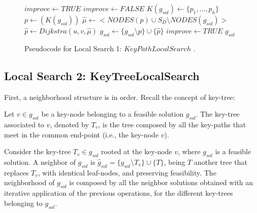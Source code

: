 \begin{figure}[H]
\begin{algorithm}[H]
\caption{$g_{sol} = KeyPathLocalSearch(G_B,C,g_{sol})$}
\begin{algorithmic}[1]
\STATE $improve \leftarrow TRUE$
\STATE $improve \leftarrow FALSE$
\STATE $K(g_{sol}) \leftarrow \{p_1,\ldots,p_h\}$ 
\STATE $p \leftarrow(K(g_{sol}))$ 
\STATE $\hat{\mu} \leftarrow <NODES(p) \cup S_D\setminus NODES(g_{sol}) > $ 
\STATE $\hat{p} \leftarrow Dijkstra(u,v,\hat{\mu})$
\STATE $g_{sol} \leftarrow \{ g_{sol}\setminus p \} \cup \{\hat{p}\}$
\STATE $improve \leftarrow TRUE$
\ENDIF
\ENDWHILE
\ENDWHILE
\RETURN $g_{sol}$
\end{algorithmic}
\end{algorithm}
\caption{Pseudocode for Local Search 1: $KeyPathLocalSearch$ \cite{11}.\label{alg-kpls}}
\end{figure}

\clearpage


\subsection{Local Search 2: KeyTreeLocalSearch}
First, a neighborhood structure is in order. Recall the concept of key-tree:

\begin{definition}
Let $v \in g_{sol}$ be a key-node belonging to a feasible solution $g_{sol}$. 
The key-tree associated to $v$, denoted by $T_v$, is the tree composed by all the 
key-paths that meet in the common end-point (i.e., the key-node $v$).
\end{definition}

\begin{definition}
Consider the key-tree $T_v \in g_{sol}$ rooted at the key-node $v$, where $g_{sol}$ is a feasible solution. 
A neighbor of $g_{sol}$ is $\hat{g}_{sol} = \{ g_{sol}\setminus T_v \} \cup \{T\}$, being 
$T$ another tree that replaces $T_v$, with identical leaf-nodes, and preserving feasibility. 
The neighborhood of $g_{sol}$ is composed by all the neighbor solutions obtained 
with an iterative application of the previous operations, for the different key-trees belonging to $g_{sol}$.
\end{definition}

